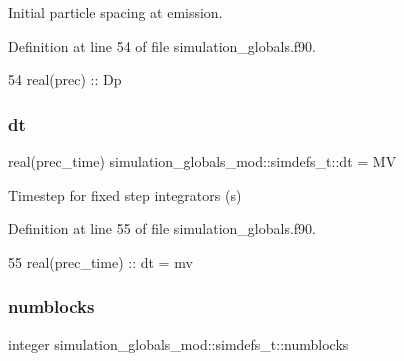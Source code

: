 Initial particle spacing at emission. 



Definition at line 54 of file simulation\+\_\+globals.\+f90.


\begin{DoxyCode}
54         \textcolor{keywordtype}{real(prec)}      ::  Dp
\end{DoxyCode}
\mbox{\label{structsimulation__globals__mod_1_1simdefs__t_acc8df5cd09283215deb732d97b44f1dc}} 
\subsubsection{\texorpdfstring{dt}{dt}}
{\footnotesize\ttfamily real(prec\+\_\+time) simulation\+\_\+globals\+\_\+mod\+::simdefs\+\_\+t\+::dt = MV\hspace{0.3cm}{\ttfamily [private]}}



Timestep for fixed step integrators (s) 



Definition at line 55 of file simulation\+\_\+globals.\+f90.


\begin{DoxyCode}
55         \textcolor{keywordtype}{real(prec\_time)} ::  dt = mv         
\end{DoxyCode}
\mbox{\label{structsimulation__globals__mod_1_1simdefs__t_a6b7497df8a36fe045f2096963db3bdde}} 
\subsubsection{\texorpdfstring{numblocks}{numblocks}}
{\footnotesize\ttfamily integer simulation\+\_\+globals\+\_\+mod\+::simdefs\+\_\+t\+::numblocks\hspace{0.3cm}{\ttfamily [private]}}



